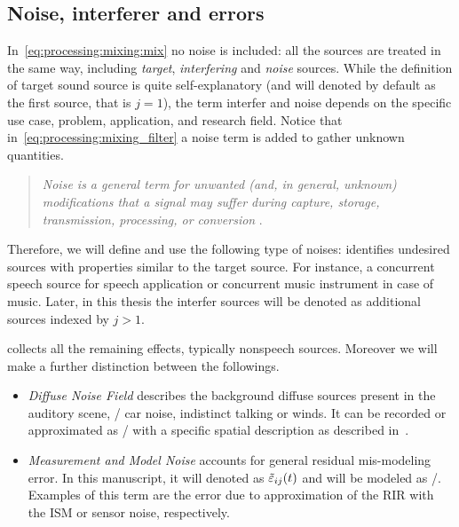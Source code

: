 \subsection{Noise, interferer and errors}
In~\cref{eq:processing:mixing:mix} no noise is included:
all the sources are treated in the same way, including \textit{target}, \textit{interfering} and \textit{noise} sources.
While the definition of target sound source is quite self-explanatory (and will denoted by default as the first source, that is $j = 1$), the term interfer and noise depends on the specific use case, problem, application, and research field.
Notice that in~\cref{eq:processing:mixing_filter} a noise term is added to gather unknown quantities.
\begin{quote}
    \textit{Noise is a general term for unwanted (and, in general, unknown) modifications that a signal may suffer during capture, storage, transmission, processing, or conversion}
    .
\end{quote}
Therefore, we will define and use the following type of noises:
 identifies undesired sources with properties similar to the target source.
For instance, a concurrent speech source for speech application or concurrent music instrument in case of music.
Later, in this thesis the interfer sources will be denoted as additional sources indexed by $j > 1$.

 collects all the remaining effects, typically nonspeech sources.
Moreover we will make a further distinction between the followings.
\begin{itemize}
    \item
    \textit{Diffuse Noise Field} describes the background diffuse sources present in the auditory scene, \eg/ car noise, indistinct talking or winds.
    It can be recorded or approximated as \AWGN/ with a specific spatial description as described in~.
    \item
    \textit{Measurement and Model Noise} accounts for general residual mis-modeling error.
    In this manuscript, it will denoted as $\tilde{\varepsilon}_{ij}( t)$ and will be modeled as \AWGN/.
    Examples of this term are the error due to approximation of the \ac{RIR} with the \acf{ISM} or sensor noise, respectively.
\end{itemize}

